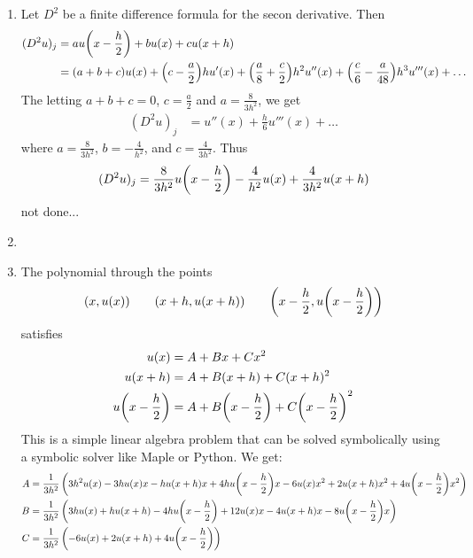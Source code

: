 \documentclass{article} %
\theoremstyle{plain}
\numberwithin{equation}{section} %
\numberwithin{figure}{section} %
\numberwithin{table}{section} %
\begin{document}
\begin{enumerate}[\ \ (a)]
    \item
        Let $D^2$ be a finite difference formula for the secon derivative.  Then
        \begin{align}
            (D^2u)_j &= au\qty(x - \frac{h}{2}) + bu\qty(x) + cu\qty(x + h) \\
            &= (a + b + c)u(x) + \qty(c - \frac{a}{2})hu'(x) + \qty(\frac{a}{8} + \frac{c}{2})h^2 u''(x) + \qty(\frac{c}{6} - \frac{a}{48})h^3u'''(x) + \dots
        \end{align}
        The letting $a + b + c = 0$, $c = \frac{a}{2}$ and $a = \frac{8}{3h^2}$, we get
        \begin{align}
            (D^2u)_j &= u''(x) + \frac{h}{6}u'''(x) + \dots
        \end{align}
        where $a = \frac{8}{3h^2}$, $b = -\frac{4}{h^2}$, and $c = \frac{4}{3h^2}$.  Thus
        \begin{align}
            (D^2 u)_j = \frac{8}{3h^2}u\qty(x - \frac{h}{2}) - \frac{4}{h^2}u(x) + \frac{4}{3h^2}u(x + h)
        \end{align}
        {\color{red} not done...}
    \item
    \item
        The polynomial through the points
        \begin{align}
            (x,u(x)) \qquad (x + h, u(x+h)) \qquad \qty(x - \frac{h}{2}, u\qty(x - \frac{h}{2}))
        \end{align}
        satisfies
        \begin{align}
            u(x) &= A + Bx + Cx^2 \\
            u(x+h) &= A + B(x+h) + C(x+h)^2 \\
            u\qty(x - \frac{h}{2}) &= A + B\qty(x - \frac{h}{2}) + C\qty(x - \frac{h}{2})^2
        \end{align}
        This is a simple linear algebra problem that can be solved symbolically using a symbolic solver like Maple or Python.  We get:
        \begin{align}
            A &= \frac{1}{3 h^{2}} \left(3 h^{2} u(x) - 3 h u(x) x - h u(x + h) x + 4 h u\qty(x - \frac{h}{2}) x - 6 u(x) x^{2} + 2 u(x + h) x^{2} + 4 u\qty(x - \frac{h}{2}) x^{2}\right) \\
            B &= \frac{1}{3 h^{2}} \left(3 h u(x) + h u(x + h) - 4 h u\qty(x - \frac{h}{2}) + 12 u(x) x - 4 u(x + h) x - 8 u\qty(x - \frac{h}{2}) x\right)\\
            C &= \frac{1}{3 h^{2}} \left(- 6 u(x) + 2 u(x + h) + 4 u\qty(x - \frac{h}{2})\right)
        \end{align}
\end{enumerate}
\end{document}

